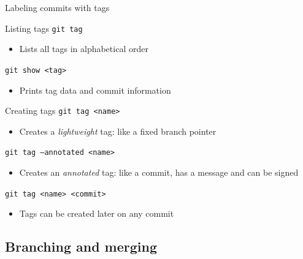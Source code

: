 \documentclass{beamer}
\begin{document}
\begin{frame}{Labeling commits with tags}
  \begin{block}{Listing tags}
    \texttt{git tag}
    \begin{itemize}
    \item Lists all tags in alphabetical order
    \end{itemize}
    \texttt{git show <tag>}
    \begin{itemize}
    \item Prints tag data and commit information
    \end{itemize}
  \end{block}
  \begin{block}{Creating tags}
    \texttt{git tag <name>}
    \begin{itemize}
    \item Creates a \emph{lightweight} tag: like a fixed branch pointer
    \end{itemize}
    \texttt{git tag --annotated <name>}
    \begin{itemize}
    \item Creates an \emph{annotated} tag: like a commit, has a message and can be signed
    \end{itemize}
    \texttt{git tag <name> <commit>}
    \begin{itemize}
    \item Tags can be created later on any commit
    \end{itemize}
  \end{block}
\end{frame}

\subsection{Branching and merging}
\end{document}
